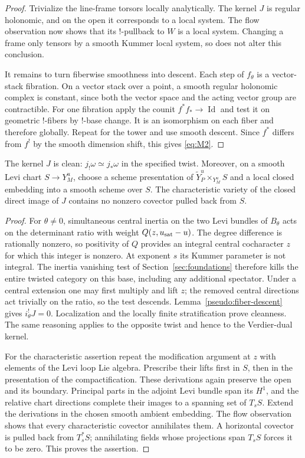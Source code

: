 \begin{proof}
Trivialize the line-frame torsors locally analytically.  The kernel $J$ is
regular holonomic, and on the open it corresponds to a local system.
The flow observation now shows that its !-pullback to $W$ is a local system.
Changing a frame only tensors by a smooth Kummer local system, so does not
alter this conclusion.

It remains to turn fiberwise smoothness into descent.  Each step of
$f_\theta$ is a vector-stack fibration.  On a vector stack over a point, a
smooth regular holonomic complex is constant, since both the vector space
and the acting vector group are contractible.  For one fibration apply the
counit $f^*f_*\to\operatorname{Id}$ and test it on geometric !-fibers by
!-base change.  It is an isomorphism on each fiber and therefore globally.
Repeat for the tower and use smooth descent.  Since $f^*$ differs from $f^!$
by the smooth dimension shift, this gives \eqref{eq:M2}.
\end{proof}

\begin{lemma}\label{pseudo:clean-noncharacteristic}
The kernel $J$ is clean: $j_!\omega\simeq j_*\omega$ in the specified twist.
Moreover, on a smooth Levi chart $S\to Y_M^u$, choose a scheme presentation
of $\widetilde Y_P^u\times_{Y_M^u}S$ and a local closed embedding into a
smooth scheme over $S$.  The characteristic variety of the closed direct
image of $J$ contains no nonzero covector pulled back from $S$.
\end{lemma}

\begin{proof}
For $\theta\ne0$, simultaneous central inertia on the two Levi bundles of
$B_\theta$ acts on the determinant ratio with weight
$Q(z,u_{\rm sat}-u)$.  The degree difference is rationally nonzero, so
positivity of $Q$ provides an integral central cocharacter $z$ for which
this integer is nonzero.  At exponent $s$ its Kummer parameter is not
integral.  The inertia vanishing test of Section~\ref{sec:foundations}
therefore kills the entire twisted category on this base, including any
additional spectator.  Under a central extension one may first multiply
and lift $z$; the removed central directions act trivially on the ratio,
so the test descends.  Lemma~\ref{pseudo:fiber-descent} gives
$i_\theta^!J=0$.  Localization and the locally finite stratification prove
cleanness.  The same reasoning applies to the opposite twist and hence to
the Verdier-dual kernel.

For the characteristic assertion repeat the modification argument at $z$
with elements of the Levi loop Lie algebra.  Prescribe their lifts first in
$S$, then in the presentation of the compactification.  These derivations
again preserve the open and its boundary.  Principal parts in the adjoint
Levi bundle span its $H^1$, and the relative chart directions complete their
images to a spanning set of $T_sS$.  Extend the derivations in the chosen
smooth ambient embedding.  The flow observation shows that every
characteristic covector annihilates them.  A horizontal covector is pulled
back from $T_s^*S$; annihilating fields whose projections span $T_sS$ forces
it to be zero.  This proves the assertion.
\end{proof}

